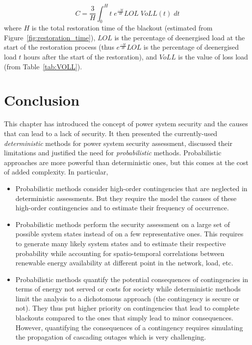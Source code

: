 \begin{equation}
    \label{eq:VOLL}
    C = \frac{3}{H} \int_0^H t \; e^{\frac{-3t}{H}} LOL \; VoLL(t) \; dt
\end{equation}
\noindent where \(H\) is the total restoration time of the blackout (estimated from Figure~\ref{fig:restoration_time}), \(LOL\) is the percentage of deenergised load at the start of the restoration process (thus \(e^{\frac{-3t}{H}} LOL\) is the percentage of deenergised load \(t\) hours after the start of the restoration), and \(VoLL\) is the value of loss load (from Table~\ref{tab:VOLL}).


\section{Conclusion}
\label{sec:security-conclusions}

This chapter has introduced the concept of power system security and the causes that can lead to a lack of security. It then presented the currently-used \emph{deterministic} methods for power system security assessment, discussed their limitations and justified the need for \emph{probabilistic} methods. Probabilistic approaches are more powerful than deterministic ones, but this comes at the cost of added complexity. In particular,

\begin{itemize}
    \item Probabilistic methods consider high-order contingencies that are neglected in deterministic assessments. But they require the model the causes of these high-order contingencies and to estimate their frequency of occurrence.
    \item Probabilistic methods perform the security assessment on a large set of possible system states instead of on a few representative ones. This requires to generate many likely system states and to estimate their respective probability while accounting for spatio-temporal correlations between renewable energy availability at different point in the network, load, etc.
    \item Probabilistic methods quantify the potential consequences of contingencies in terms of energy not served or costs for society while deterministic methods limit the analysis to a dichotomous approach (the contingency is secure or not). They thus put higher priority on contingencies that lead to complete blackouts compared to the ones that simply lead to minor consequences. However, quantifying the consequences of a contingency requires simulating the propagation of cascading outages which is very challenging.
\end{itemize}

